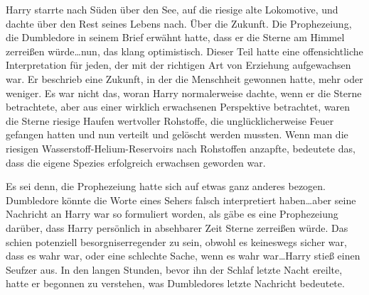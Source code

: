 Harry starrte nach Süden über den See, auf die riesige alte Lokomotive, und dachte über den Rest seines Lebens nach.
Über die Zukunft.
Die Prophezeiung, die Dumbledore in seinem Brief erwähnt hatte, dass er die Sterne am Himmel zerreißen würde…nun, das klang optimistisch. Dieser Teil hatte eine offensichtliche Interpretation für jeden, der mit der richtigen Art von Erziehung aufgewachsen war.
Er beschrieb eine Zukunft, in der die Menschheit gewonnen hatte, mehr oder weniger. Es war nicht das, woran Harry normalerweise dachte, wenn er die Sterne betrachtete, aber aus einer wirklich erwachsenen Perspektive betrachtet, waren die Sterne riesige Haufen wertvoller Rohstoffe, die unglücklicherweise Feuer gefangen hatten und nun verteilt und gelöscht werden mussten. Wenn man die riesigen Wasserstoff-Helium-Reservoirs nach Rohstoffen anzapfte, bedeutete das, dass die eigene Spezies erfolgreich erwachsen geworden war.

Es sei denn, die Prophezeiung hatte sich auf etwas ganz anderes bezogen. Dumbledore könnte die Worte eines Sehers falsch interpretiert haben…aber seine Nachricht an Harry war so formuliert worden, als gäbe es eine Prophezeiung darüber, dass Harry persönlich in absehbarer Zeit Sterne zerreißen würde. Das schien potenziell besorgniserregender zu sein, obwohl es keineswegs sicher war, dass es wahr war, oder eine schlechte Sache, wenn es wahr war…Harry stieß einen Seufzer aus. In den langen Stunden, bevor ihn der Schlaf letzte Nacht ereilte, hatte er begonnen zu verstehen, was Dumbledores letzte Nachricht bedeutete.

